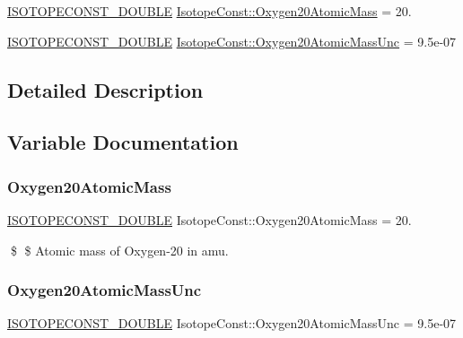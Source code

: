 \begin{DoxyCompactItemize}
\item 
\mbox{\hyperlink{group___isotope_const-_macros_ga8f45a7272ce02c0b4c65c44636ed719a}{I\+S\+O\+T\+O\+P\+E\+C\+O\+N\+S\+T\+\_\+\+D\+O\+U\+B\+LE}} \mbox{\hyperlink{group___isotope_const-_oxygen-_o20_ga4475bab5005dcf2bc436233ecd1336af}{Isotope\+Const\+::\+Oxygen20\+Atomic\+Mass}} = 20.
\item 
\mbox{\hyperlink{group___isotope_const-_macros_ga8f45a7272ce02c0b4c65c44636ed719a}{I\+S\+O\+T\+O\+P\+E\+C\+O\+N\+S\+T\+\_\+\+D\+O\+U\+B\+LE}} \mbox{\hyperlink{group___isotope_const-_oxygen-_o20_ga1ff26e804d9312689876d98f2fc35228}{Isotope\+Const\+::\+Oxygen20\+Atomic\+Mass\+Unc}} = 9.\+5e-\/07
\end{DoxyCompactItemize}


\subsection{Detailed Description}


\subsection{Variable Documentation}
\mbox{\label{group___isotope_const-_oxygen-_o20_ga4475bab5005dcf2bc436233ecd1336af}} 
\subsubsection{\texorpdfstring{Oxygen20\+Atomic\+Mass}{Oxygen20AtomicMass}}
{\footnotesize\ttfamily \mbox{\hyperlink{group___isotope_const-_macros_ga8f45a7272ce02c0b4c65c44636ed719a}{I\+S\+O\+T\+O\+P\+E\+C\+O\+N\+S\+T\+\_\+\+D\+O\+U\+B\+LE}} Isotope\+Const\+::\+Oxygen20\+Atomic\+Mass = 20.}

\$ \$ Atomic mass of Oxygen-\/20 in amu. \mbox{\label{group___isotope_const-_oxygen-_o20_ga1ff26e804d9312689876d98f2fc35228}} 
\subsubsection{\texorpdfstring{Oxygen20\+Atomic\+Mass\+Unc}{Oxygen20AtomicMassUnc}}
{\footnotesize\ttfamily \mbox{\hyperlink{group___isotope_const-_macros_ga8f45a7272ce02c0b4c65c44636ed719a}{I\+S\+O\+T\+O\+P\+E\+C\+O\+N\+S\+T\+\_\+\+D\+O\+U\+B\+LE}} Isotope\+Const\+::\+Oxygen20\+Atomic\+Mass\+Unc = 9.\+5e-\/07}

